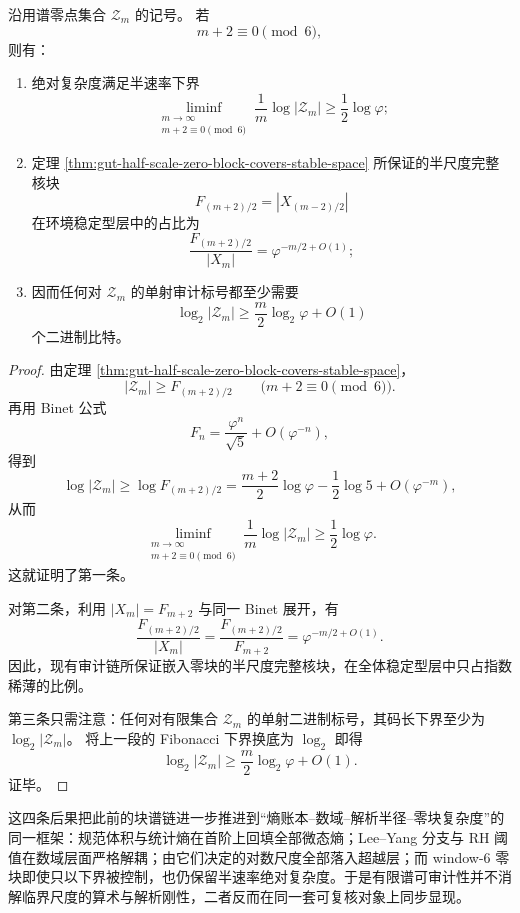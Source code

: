 \begin{theorem}[六倍窗零块的半速率复杂度下界与单射审计预算]\label{thm:gut-window6-zero-block-half-rate-budget}
沿用谱零点集合 \(\mathcal Z_m\) 的记号。
若
\[
m+2\equiv 0\pmod 6,
\]
则有：
\begin{enumerate}
  \item 绝对复杂度满足半速率下界
  \[
  \liminf_{\substack{m\to\infty\\ m+2\equiv 0\!\!\!\pmod 6}}
  \frac{1}{m}\log|\mathcal Z_m|
  \ge
  \frac{1}{2}\log\varphi;
  \]
  \item 定理 \ref{thm:gut-half-scale-zero-block-covers-stable-space} 所保证的半尺度完整核块
  \[
  F_{(m+2)/2}=|X_{(m-2)/2}|
  \]
  在环境稳定型层中的占比为
  \[
  \frac{F_{(m+2)/2}}{|X_m|}
  =
  \varphi^{-m/2+O(1)};
  \]
  \item 因而任何对 \(\mathcal Z_m\) 的单射审计标号都至少需要
  \[
  \log_2|\mathcal Z_m|
  \ge
  \frac{m}{2}\log_2\varphi+O(1)
  \]
  个二进制比特。
\end{enumerate}
\end{theorem}
\begin{proof}
由定理 \ref{thm:gut-half-scale-zero-block-covers-stable-space}，
\[
|\mathcal Z_m|\ge F_{(m+2)/2}
\qquad
\bigl(m+2\equiv 0\!\!\!\pmod 6\bigr).
\]
再用 Binet 公式
\[
F_n=\frac{\varphi^n}{\sqrt5}+O(\varphi^{-n}),
\]
得到
\[
\log|\mathcal Z_m|
\ge
\log F_{(m+2)/2}
=
\frac{m+2}{2}\log\varphi-\frac12\log 5+O(\varphi^{-m}),
\]
从而
\[
\liminf_{\substack{m\to\infty\\ m+2\equiv 0\!\!\!\pmod 6}}
\frac{1}{m}\log|\mathcal Z_m|
\ge
\frac12\log\varphi.
\]
这就证明了第一条。
\par
对第二条，利用 \(|X_m|=F_{m+2}\) 与同一 Binet 展开，有
\[
\frac{F_{(m+2)/2}}{|X_m|}
=
\frac{F_{(m+2)/2}}{F_{m+2}}
=
\varphi^{-m/2+O(1)}.
\]
因此，现有审计链所保证嵌入零块的半尺度完整核块，在全体稳定型层中只占指数稀薄的比例。
\par
第三条只需注意：任何对有限集合 \(\mathcal Z_m\) 的单射二进制标号，其码长下界至少为 \(\log_2|\mathcal Z_m|\)。
将上一段的 Fibonacci 下界换底为 \(\log_2\) 即得
\[
\log_2|\mathcal Z_m|
\ge
\frac{m}{2}\log_2\varphi+O(1).
\]
证毕。
\end{proof}

这四条后果把此前的块谱链进一步推进到“熵账本--数域--解析半径--零块复杂度”的同一框架：规范体积与统计熵在首阶上回填全部微态熵；Lee--Yang 分支与 RH 阈值在数域层面严格解耦；由它们决定的对数尺度全部落入超越层；而 window-\(6\) 零块即使只以下界被控制，也仍保留半速率绝对复杂度。于是有限谱可审计性并不消解临界尺度的算术与解析刚性，二者反而在同一套可复核对象上同步显现。
